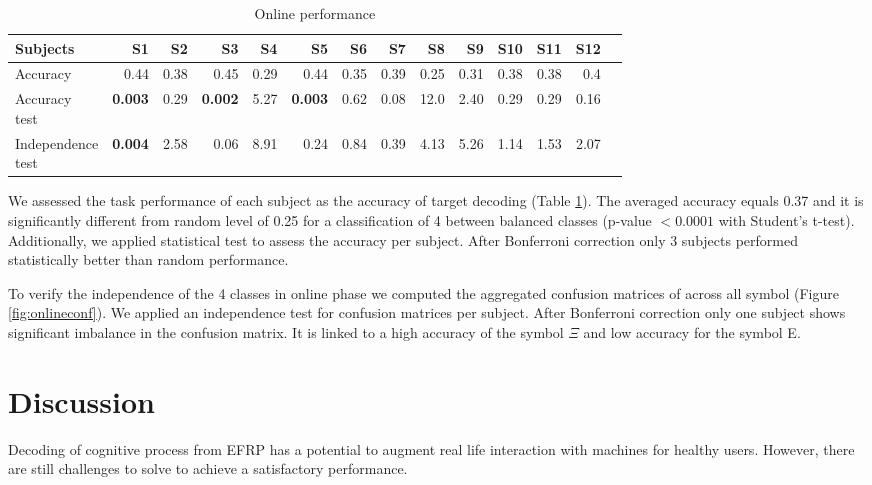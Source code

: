 \documentclass[12pt]{iopart}
\begin{document}
\begin{table}
    \centering
    \caption{Online performance}
    \scriptsize
    \renewcommand{\arraystretch}{1.5}
    \begin{tabular}{l r r r r r r r r r r r r r}
        \hline
        Subjects & S1 & S2 & S3 & S4 & S5 & S6 & S7 & S8 & S9 & S10 & S11 & S12 \\
        \hline

        Accuracy & 0.44 & 0.38 & 0.45 & 0.29 & 0.44 & 0.35 & 0.39 & 0.25 & 0.31 & 0.38 & 0.38 & 0.4 \\ 
        \shortstack{Accuracy \\ test} & \textbf{0.003} & 0.29 & \textbf{0.002} & 5.27 & \textbf{0.003} & 0.62 & 0.08 & 12.0 & 2.40 & 0.29 & 0.29 &
        0.16 \\
        \shortstack{Independence \\ test}  & \textbf{ 0.004} & 2.58 & 0.06 & 8.91 & 0.24 & 0.84 & 0.39 & 4.13 & 5.26 & 1.14 & 1.53
        & 2.07 \\
        \hline
    \end{tabular}
    \label{tab:onlineperf}
\end{table}

We assessed the task performance of each subject as the accuracy of
target decoding (Table \ref{tab:onlineperf}). The averaged accuracy 
equals 0.37 and it is significantly different from random level of 0.25 for
a classification of 4 between balanced classes (p-value $< 0.0001$ with Student's t-test).
Additionally, we applied statistical test to assess the accuracy per subject.
After Bonferroni correction only 3 subjects performed statistically better than random performance.

To verify the independence of the 4 classes in online phase
we computed the aggregated confusion matrices of across all symbol (Figure \ref{fig:onlineconf}).
We applied an independence test for confusion matrices per subject.
After Bonferroni correction only one subject shows significant imbalance in the
confusion matrix. It is linked to a high accuracy of the symbol $\Xi$ and low accuracy 
for the symbol E.


\section{Discussion}
\label{sec:discussion}
Decoding of cognitive process from EFRP has a potential to augment
real life interaction with machines for healthy users.
However, there are still challenges to solve to achieve
a satisfactory performance.
\end{document}
